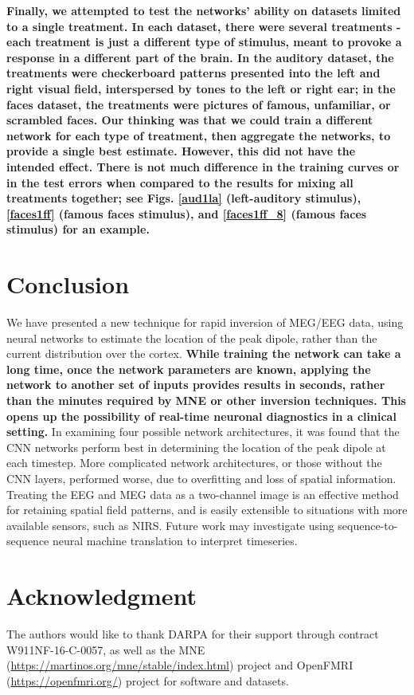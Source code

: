 \documentclass[journal]{IEEEtran}
\begin{document}
\textbf{Finally, we attempted to test the networks' ability on datasets limited to a single treatment. In each dataset, there were several treatments - each treatment is just a different type of stimulus, meant to provoke a response in a different part of the brain. In the auditory dataset, the treatments were checkerboard patterns presented into the left and right visual field, interspersed by tones to the left or right ear; in the faces dataset, the treatments were pictures of famous, unfamiliar, or scrambled faces. Our thinking was that we could train a different network for each type of treatment, then aggregate the networks, to provide a single best estimate. However, this did not have the intended effect. There is not much difference in the training curves or in the test errors when compared to the results for mixing all treatments together; see Figs. \ref{aud1la} (left-auditory stimulus), \ref{faces1ff} (famous faces stimulus), and \ref{faces1ff_8} (famous faces stimulus) for an example.}


\section{Conclusion}
We have presented a new technique for rapid inversion of MEG/EEG data, using neural networks to estimate the location of the peak dipole, rather than the current distribution over the cortex. \textbf{While training the network can take a long time, once the network parameters are known, applying the network to another set of inputs provides results in seconds, rather than the minutes required by MNE or other inversion techniques. This opens up the possibility of real-time neuronal diagnostics in a clinical setting.} In examining four possible network architectures, it was found that the CNN networks perform best in determining the location of the peak dipole at each timestep. More complicated network architectures, or those without the CNN layers, performed worse, due to overfitting and loss of spatial information. Treating the EEG and MEG data as a two-channel image is an effective method for retaining spatial field patterns, and is easily extensible to situations with more available sensors, such as NIRS. Future work may investigate using sequence-to-sequence neural machine translation to interpret timeseries.


\section*{Acknowledgment}
The authors would like to thank DARPA for their support through contract W911NF-16-C-0057, as well as the MNE (\url{https://martinos.org/mne/stable/index.html}) project and OpenFMRI (\url{https://openfmri.org/}) project for software and datasets.
\end{document}
